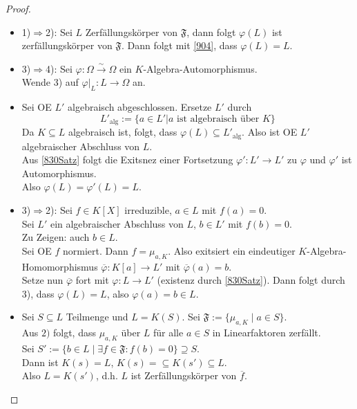 \documentclass[10pt,a4paper]{article}
\newcommand{\ol}[1]{\overline{#1}}
\newcommand{\isomfunc}{\ensuremath{\xrightarrow{\sim}}}
\theoremstyle{definition}
\theoremstyle{plain}
\theoremstyle{remark}
\begin{document}
\begin{proof}
	\begin{itemize}
		\item 1)$\Rightarrow$2): Sei $L$ Zerfällungskörper von $\mathfrak F$, dann folgt $\varphi(L)$ ist zerfällungskörper von $\mathfrak F$. Dann folgt mit \ref{904}, dass $\varphi(L)=L$.
		\item 3)$\Rightarrow$4): Sei $\varphi:\Omega\isomfunc\Omega$ ein $K$-Algebra-Automorphismus.\\
		Wende 3) auf $\varphi|_L:L\rightarrow \Omega$ an.
		\item Sei OE $L'$ algebraisch abgeschlossen. Ersetze $L'$ durch
		\[L'_{\text{alg}}:=\{a\in L'|\text{$a$ ist algebraisch über $K$}\}\]
		Da $K\subseteq L$ algebraisch ist, folgt, dass $\varphi(L)\subseteq L'_\text{alg}$. Also ist OE $L'$ algebraischer Abschluss von $L$.\\
		Aus \ref{830Satz} folgt die Exitsnez einer Fortsetzung $\varphi':L'\rightarrow L'$ zu $\varphi$ und $\varphi'$ ist Automorphismus.\\
		Also $\varphi(L)=\varphi'(L)=L$.\\
		\item 3)$\Rightarrow$2): Sei $f\in K[X]$ irreduzible, $a\in L$ mit $f(a)=0$.\\
		Sei $L'$ ein algebraischer Abschluss von $L$, $b\in L'$ mit $f(b)=0$.\\
		Zu Zeigen: auch $b\in L$.\\
		Sei OE $f$ normiert. Dann $f=\mu_{a,K}$. Also exitsiert ein eindeutiger $K$-Algebra-Homomorphismus $\ol \varphi:K[a]\rightarrow L'$ mit $\ol{\varphi}(a)=b$.\\
		Setze nun $\ol \varphi$ fort mit $\varphi:L\rightarrow L'$ (existenz durch \ref{830Satz}).
		Dann folgt durch 3), dass $\varphi(L)=L$, also $\varphi(a)=b\in L$.
		\item Sei $S\subseteq L$ Teilmenge und $L=K(S)$. Sei $\mathfrak F:=\{\mu_{a,K}\mid a\in S\}$.\\
		Aus $2)$ folgt, dass $\mu_{a,K}$ über $L$ für alle $a\in S$ in Linearfaktoren zerfällt.\\
		Sei $S':=\{b\in L\mid\exists f\in\mathfrak F:f(b)=0 \}\supseteq S$.\\
		Dann ist $K(s)=L$, $K(s)=\subseteq K(s')\subseteq L$.\\
		Also $L=K(s')$, d.h. $L$ ist Zerfällungskörper von $\ol f$.
	\end{itemize}
\end{proof}
\end{document}
